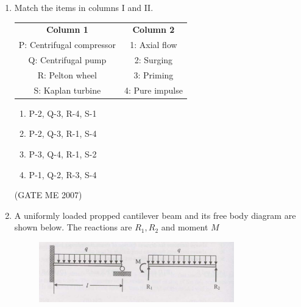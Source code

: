 \documentclass[journal]{IEEEtran}
\begin{document}
\begin{enumerate}
Q: Vorticity is zero at all points in the flow.

R: Velocity is directly proportional to the radius from the centre of the vortex.  

S: Total mechanical energy per unit mass is constant in the entire flow field.

\begin{multicols}{4}
\begin{enumerate}
\item P and Q
\item R and S
\item P and R
\item P and S
\end{enumerate}
\end{multicols}
\hfill (GATE ME 2007)

\item Match the items in columns I and II. 

\begin{tabular}{cc}
\textbf{Column 1}         & \textbf{Column 2}\\
P: Centrifugal compressor & 1: Axial flow \\
Q: Centrifugal pump       & 2: Surging \\ 
R: Pelton wheel           & 3: Priming \\  
S: Kaplan turbine         & 4: Pure impulse \\ 
\end{tabular}

\begin{multicols}{2}
\begin{enumerate}
\item P-2, Q-3, R-4, S-1
\item P-2, Q-3, R-1, S-4
\item P-3, Q-4, R-1, S-2
\item P-1, Q-2, R-3, S-4
\end{enumerate}
\end{multicols}
\hfill (GATE ME 2007)

\item A uniformly loaded propped cantilever beam and its free body diagram are shown below. The reactions are  
$ R_1, R_2 $ and moment $ M $

\begin{figure}[H]
    \centering
    \includegraphics[width=0.8\textwidth]{Fig 2.png}
    \caption{}
    \label{fig:question42}
\end{figure}


\end{enumerate}
\end{document}
